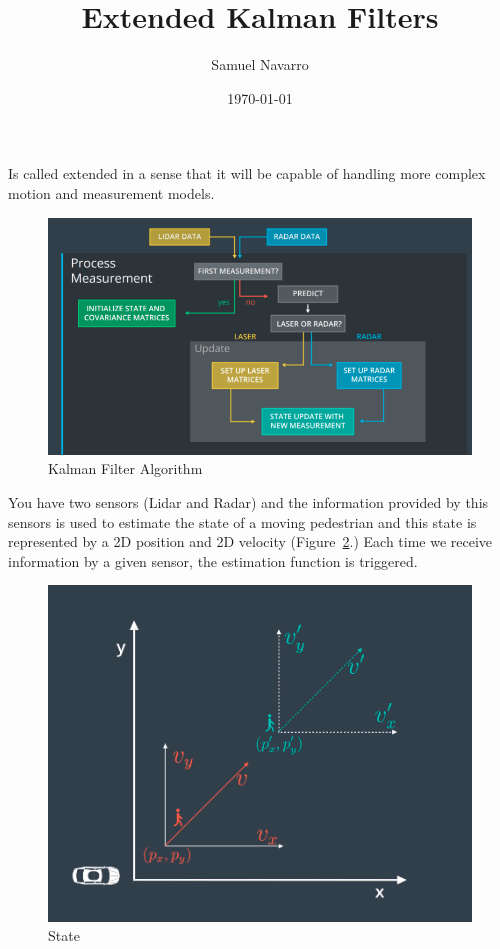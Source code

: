\documentclass[11pt, a4paper]{article}
\begin{document}
\title{Extended Kalman Filters}
\author{Samuel Navarro}
\date{\today}
\maketitle
\tableofcontents{}


Is called extended in a sense that it will be capable of handling more complex motion and measurement models. 

\begin{figure}[htpb!]
	\centering
	\includegraphics[width=0.8\linewidth]{kalman_filter_algorithm}
	\caption{Kalman Filter Algorithm}
	\label{fig:kalman_filter_algorithm}
\end{figure}


You have two sensors (Lidar and Radar) and the information provided by this sensors is used to estimate the state of a moving pedestrian and this state is represented by a 2D position and 2D velocity (Figure~\ref{fig:states}.) Each time we receive information by a given sensor, the estimation function is triggered. 

\begin{figure}[htpb!]
	\centering
	\includegraphics[width=0.8\linewidth]{states}
	\caption{State}
	\label{fig:states}
\end{figure}
\end{document}
